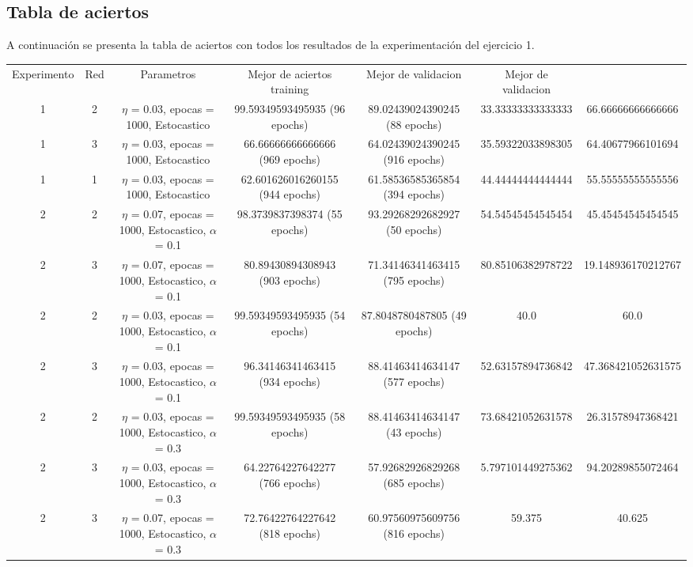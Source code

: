 \subsection{Tabla de aciertos}
A continuación se presenta la tabla de aciertos con todos los resultados de la experimentación del ejercicio 1.
\begin{table}[h!]
	\begin{tabular}{c|c|c|c|c|c|c}
		Experimento & Red & Parametros & Mejor  de aciertos training & Mejor  de validacion & Mejor  de validacion \\
		1 & 2 & $\eta$ = 0.03, epocas = 1000, Estocastico & 99.59349593495935 (96 epochs) & 89.02439024390245 (88 epochs) &  33.33333333333333 & 66.66666666666666 \\
		1 & 3 & $\eta$ = 0.03, epocas = 1000, Estocastico & 66.66666666666666 (969 epochs) & 64.02439024390245 (916 epochs) &  35.59322033898305 & 64.40677966101694 \\
		1 & 1 & $\eta$ = 0.03, epocas = 1000, Estocastico & 62.601626016260155 (944 epochs) & 61.58536585365854 (394 epochs) &  44.44444444444444 & 55.55555555555556 \\
		2 & 2 & $\eta$ = 0.07, epocas = 1000, Estocastico, $\alpha$ = 0.1 & 98.3739837398374 (55 epochs) & 93.29268292682927 (50 epochs) &  54.54545454545454 & 45.45454545454545 \\
		2 & 3 & $\eta$ = 0.07, epocas = 1000, Estocastico, $\alpha$ = 0.1  & 80.89430894308943 (903 epochs) & 71.34146341463415 (795 epochs) &  80.85106382978722 & 19.148936170212767 \\
		2 & 2 &  $\eta$ = 0.03, epocas = 1000, Estocastico, $\alpha$ = 0.1 & 99.59349593495935 (54 epochs) & 87.8048780487805 (49 epochs) &  40.0 & 60.0 \\
		2 & 3 &  $\eta$ = 0.03, epocas = 1000, Estocastico, $\alpha$ = 0.1 & 96.34146341463415 (934 epochs) & 88.41463414634147 (577 epochs) &  52.63157894736842 & 47.368421052631575 \\
		2 & 2 &  $\eta$ = 0.03, epocas = 1000, Estocastico, $\alpha$ = 0.3 & 99.59349593495935 (58 epochs) & 88.41463414634147 (43 epochs) &  73.68421052631578 & 26.31578947368421 \\
		2 & 3 &  $\eta$ = 0.03, epocas = 1000, Estocastico, $\alpha$ = 0.3 & 64.22764227642277 (766 epochs) & 57.92682926829268 (685 epochs) &  5.797101449275362 & 94.20289855072464 \\
		2 & 3 & $\eta$ = 0.07, epocas = 1000, Estocastico, $\alpha$ = 0.3 & 72.76422764227642 (818 epochs) & 60.97560975609756 (816 epochs) &  59.375 & 40.625 \\

\end{tabular}
\end{table}
